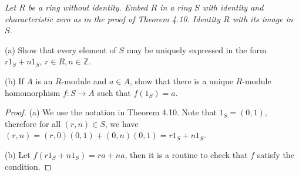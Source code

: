 \begin{problem}\em
Let $R$ be a ring without identity. Embed $R$ in a ring $S$ with identity and characteristic zero as in the proof of Theorem 4.10. Identity $R$ with its image in $S$.\par
(a) Show that every element of $S$ may be uniquely expressed in the form $r1_S+n1_S$, $r\in R, n\in\mathbb{Z}$.\par
(b) If $A$ is an $R$-module and $a\in A$, show that there is a unique $R$-module homomorphism $f:S\to A$ such that $f(1_S)=a$.
\end{problem}
\begin{proof}
(a) We use the notation in Theorem 4.10. Note that $1_S=(0,1)$, therefore for all $(r,n)\in S$, we have $(r,n)=(r,0)(0,1)+(0,n)(0,1)=r1_S+n1_S$.\par
(b) Let $f(r1_S+n1_S)=ra+na$, then it is a routine to check that $f$ satisfy the condition.
\end{proof}
